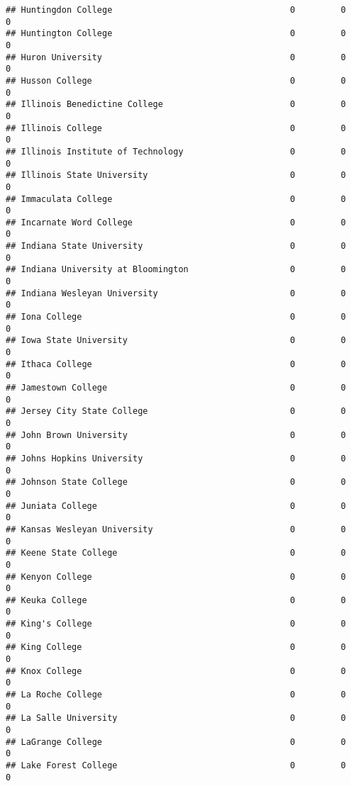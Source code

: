 \documentclass[
]{article}
\begin{document}
\begin{verbatim}
## Huntingdon College                                   0         0           0
## Huntington College                                   0         0           0
## Huron University                                     0         0           0
## Husson College                                       0         0           0
## Illinois Benedictine College                         0         0           0
## Illinois College                                     0         0           0
## Illinois Institute of Technology                     0         0           0
## Illinois State University                            0         0           0
## Immaculata College                                   0         0           0
## Incarnate Word College                               0         0           0
## Indiana State University                             0         0           0
## Indiana University at Bloomington                    0         0           0
## Indiana Wesleyan University                          0         0           0
## Iona College                                         0         0           0
## Iowa State University                                0         0           0
## Ithaca College                                       0         0           0
## Jamestown College                                    0         0           0
## Jersey City State College                            0         0           0
## John Brown University                                0         0           0
## Johns Hopkins University                             0         0           0
## Johnson State College                                0         0           0
## Juniata College                                      0         0           0
## Kansas Wesleyan University                           0         0           0
## Keene State College                                  0         0           0
## Kenyon College                                       0         0           0
## Keuka College                                        0         0           0
## King's College                                       0         0           0
## King College                                         0         0           0
## Knox College                                         0         0           0
## La Roche College                                     0         0           0
## La Salle University                                  0         0           0
## LaGrange College                                     0         0           0
## Lake Forest College                                  0         0           0

\end{verbatim}
\end{document}
